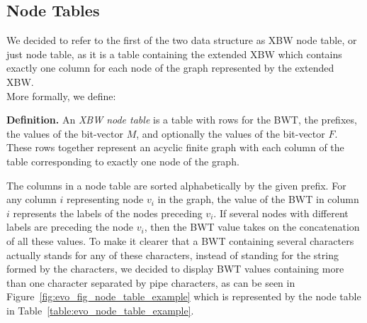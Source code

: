 \documentclass[a4paper,12pt,twoside,BCOR=10mm]{scrbook}
\begin{document}
\subsection{Node Tables}
\label{sec:node_table_definition}

We decided to refer to the first of the two data structure as XBW node table, or just node table,
as it is a
table containing the extended XBW which contains exactly one column for each
node of the graph represented by the extended XBW. \\
More formally, we define:

\textbf{Definition.} An \textit{XBW node table}\label{def:node_table} is a table with rows for the BWT,
the prefixes, the values of the bit-vector $ M $, and optionally the values of the bit-vector $ F $.
These rows together represent an acyclic finite graph with each column of the table corresponding
to exactly one node of the graph.

The columns in a node table are sorted alphabetically by the given prefix.
For any column $ i $ representing node $ v_i $ in the graph,
the value of the BWT in column $ i $ represents the labels of the nodes
preceding $ v_i $.
If several nodes with different labels are preceding the node $ v_i $,
then the BWT value takes on the concatenation of all these values.
To make it clearer that a BWT containing several characters actually
stands for any of these characters, instead of standing for the string
formed by the characters, we decided to display BWT values containing
more than one character separated by pipe characters, as can be
seen in Figure~\ref{fig:evo_fig_node_table_example} which is represented
by the node table in Table~\ref{table:evo_node_table_example}.
\end{document}
